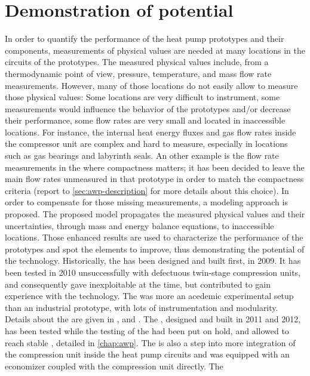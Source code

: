 \section{Demonstration of potential}
\label{sec:potential-demo}

In order to quantify the performance of the heat pump prototypes and
their components, measurements of physical values are needed at many
locations in the circuits of the prototypes. The measured physical
values include, from a thermodynamic point of view, pressure,
temperature, and mass flow rate measurements. However, many of those
locations do not easily allow to measure those physical values: Some
locations are very difficult to instrument, some measurements would
influence the behavior of the prototypes and/or decrease their
performance, some flow rates are very small and located in
inaccessible locations. For instance, the internal heat energy fluxes
and gas flow rates inside the compressor unit are complex and hard to
measure, especially in locations such as gas bearings and labyrinth
seals. An other example is the flow rate measurements in the \AWP{}
where compactness matters; it has been decided to leave the main flow
rates unmeasured in that prototype in order to match the compactness
criteria (report to \cref{sec:awp-description} for more details about
this choice). In order to compensate for those missing measurements, a
modeling approach is proposed. The proposed model propagates the
measured physical values and their uncertainties, through mass and
energy balance equations, to inaccessible locations. Those enhanced
results are used to characterize the performance of the prototypes and
spot the elements to improve, thus demonstrating the potential of the
technology. Historically, the \BWP{} has been designed and built
first, in 2009. It has been tested in 2010 unsuccessfully with
defectuous twin-stage compression units, and consequently gave
inexploitable \OP{} at the time, but contributed to gain experience
with the technology. The \BWP{} was more an acedemic experimental
setup than an industrial prototype, with lots of instrumentation and
modularity. Details about the \BWP{} are given in ,
and . The \AWP{}, designed and built in
2011 and 2012, has been tested while the testing of the \BWP{} had
been put on hold, and allowed to reach stable \OP{}, detailed in
\cref{chap:awp}. The \AWP{} is also a step into more integration of
the compression unit inside the heat pump circuits and was equipped
with an economizer coupled with the compression unit directly. The
